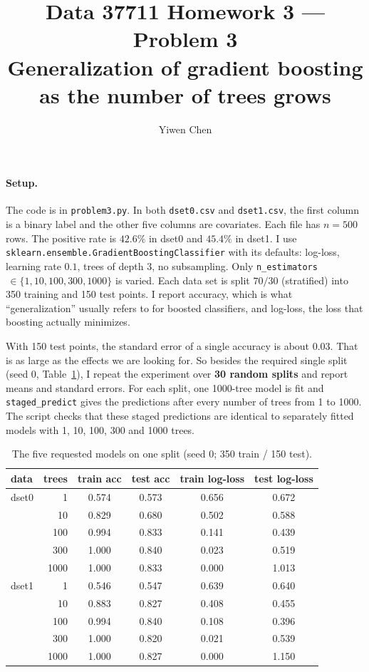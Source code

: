 \documentclass[11pt]{article}
\title{Data 37711 Homework 3 --- Problem 3\\
\large Generalization of gradient boosting as the number of trees grows}
\author{Yiwen Chen}
\date{}
\begin{document}
\maketitle

\paragraph{Setup.} The code is in \texttt{problem3.py}. In both \texttt{dset0.csv} and
\texttt{dset1.csv}, the first column is a binary label and the other five columns are covariates.
Each file has $n=500$ rows. The positive rate is $42.6\%$ in dset0 and $45.4\%$ in dset1. I use
\texttt{sklearn.ensemble.GradientBoostingClassifier} with its defaults: log-loss, learning rate
$0.1$, trees of depth 3, no subsampling. Only \texttt{n\_estimators}$\,\in\{1,10,100,300,1000\}$
is varied. Each data set is split $70/30$ (stratified) into 350 training and 150 test points.
I report accuracy, which is what ``generalization'' usually refers to for boosted classifiers,
and log-loss, the loss that boosting actually minimizes.

With 150 test points, the standard error of a single accuracy is about $0.03$. That is as large as
the effects we are looking for. So besides the required single split (seed 0, Table~\ref{tab:single}),
I repeat the experiment over \textbf{30 random splits} and report means and standard errors. For
each split, one 1000-tree model is fit and \texttt{staged\_predict} gives the predictions after
every number of trees from 1 to 1000. The script checks that these staged predictions are identical
to separately fitted models with 1, 10, 100, 300 and 1000 trees.

\begin{table}[H]\centering\small
\begin{tabular}{lrcccc}
\toprule
data & trees & train acc & test acc & train log-loss & test log-loss\\
\midrule
dset0 & 1    & 0.574 & 0.573 & 0.656 & 0.672\\
      & 10   & 0.829 & 0.680 & 0.502 & 0.588\\
      & 100  & 0.994 & 0.833 & 0.141 & 0.439\\
      & 300  & 1.000 & 0.840 & 0.023 & 0.519\\
      & 1000 & 1.000 & 0.833 & 0.000 & 1.013\\
\midrule
dset1 & 1    & 0.546 & 0.547 & 0.639 & 0.640\\
      & 10   & 0.883 & 0.827 & 0.408 & 0.455\\
      & 100  & 0.994 & 0.840 & 0.108 & 0.396\\
      & 300  & 1.000 & 0.820 & 0.021 & 0.539\\
      & 1000 & 1.000 & 0.827 & 0.000 & 1.150\\
\bottomrule
\end{tabular}
\caption{The five requested models on one split (seed 0; 350 train / 150 test).}
\label{tab:single}
\end{table}
\end{document}
